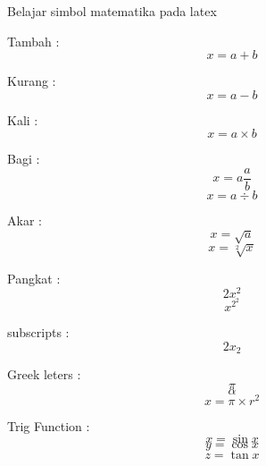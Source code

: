 \documentclass[12pt]{article}
\begin{document}
	Belajar simbol matematika pada latex
	
	Tambah : 
	$$ x = a + b$$
	
	Kurang : 
	$$ x = a - b $$
	
	Kali : 
	$$ x = a \times b $$
	
	Bagi : 
	$$ x = a \frac{a}{b} $$
	$$ x = a\div b $$
	
	Akar :
	$$ x = \sqrt{a}$$
	$$ x = \sqrt[2]{x}$$
	
	Pangkat : 
	$$ 2x^{2} $$
	$$ x^{2^2} $$
	
	subscripts : 
	$$ 2x_{2}$$
	
	Greek leters : 
	$$\pi$$
	$$\alpha$$
	$$ x = \pi \times r^2 $$
	
	Trig Function : 
	$$ x = \sin{x}$$
	$$ y = \cos x $$
	$$ z = \tan x $$
	
\end{document}
